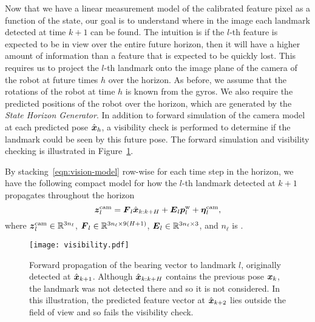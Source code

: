 Now that we have a linear measurement model of the calibrated feature pixel as a function of the state, our goal is to understand where in the image each landmark detected at time $k+1$ can be found.
The intuition is if the $l$-th feature is expected to be in view over the entire future horizon, then it will have a higher amount of information than a feature that is expected to be quickly lost.
This requires us to project the $l$-th landmark onto the image plane of the camera of the robot at future times $h$ over the horizon.
As before, we assume that the rotations of the robot at time $h$ is known from the gyros.
We also require the predicted positions of the robot over the horizon, which are generated by the \emph{State Horizon Generator}.
In addition to forward simulation of the camera model at each predicted pose $\hat{\boldsymbol x}_h$, a visibility check is performed to determine if the landmark could be seen by this future pose.
The forward simulation and visibility checking is illustrated in Figure~\ref{fig:visibility}.

By stacking~\eqref{eqn:vision-model} row-wise for each time step in the horizon, we have the following compact model for how the $l$-th landmark detected at $k+1$ propagates throughout the horizon
\begin{equation}\label{eqn:vision-model-stacked}
\boldsymbol z_l^\text{cam} = \boldsymbol F_l\hat{\boldsymbol x}_{k:k+H} + \boldsymbol E_l\boldsymbol p^\text{w}_l + \boldsymbol \eta_l^\text{cam},
\end{equation}
where $\boldsymbol z_l^\text{cam}\in\mathbb{R}^{3n_\ell}$, $\boldsymbol F_l\in\mathbb{R}^{3n_\ell\times 9(H+1)}$, $\boldsymbol E_l\in\mathbb{R}^{3n_\ell\times 3}$, and $n_\ell$ is .


\begin{figure}
\centering
\texttt{[image: visibility.pdf]} 
\caption{Forward propagation of the bearing vector to landmark $l$, originally detected at $\hat{\boldsymbol x}_{k+1}$. Although $\hat{\boldsymbol x}_{k:k+H}$ contains the previous pose $\boldsymbol x_k$, the landmark was not detected there and so it is not considered. In this illustration, the predicted feature vector at $\hat{\boldsymbol x}_{k+2}$ lies outside the field of view and so fails the visibility check.}
\label{fig:visibility}
\end{figure}


